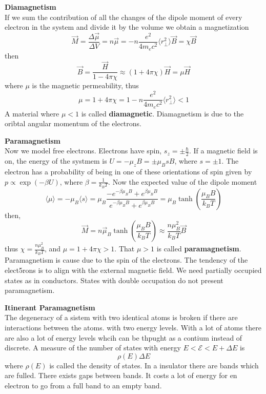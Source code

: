 \documentclass[12pt,a4paper]{article}
\begin{document}
\textbf{Diamagnetism}\\
If we sum the contribution of all the changes of the dipole moment of every electron in the system and divide it by the volume we obtain a magnetization
\begin{equation}
	\vec{M} = \frac{\Delta \vec{\mu}}{\Delta V} = n\vec{\mu} = -n\frac{e^2}{4m_e c^2} \langle r_{\perp}^2 \rangle \vec{B} = \chi \vec{B}
\end{equation}
then
\begin{equation}
	\vec{B} = \frac{\vec{H}}{1-4\pi\chi} \approx (1+4\pi\chi)\vec{H} = \mu \vec{H}
\end{equation}
where $ \mu$ is the magnetic permeability, thus
\begin{equation}
	\mu =1 + 4\pi\chi = 1 -n\frac{e^2}{4m_e c^2} \langle r_{\perp}^2 \rangle < 1
\end{equation}
A material where $\mu < 1$ is called \textbf{diamagnetic}. Diamagnetism is due to the oribtal angular momentum of the electrons.

\textbf{Paramagnetism}\\
Now we model free electrons. Electrons have spin, $s_z = \pm \frac{\hbar}{2}$. If a magnetic field is on, the energy of the systmem is $U = -\mu_z B =\pm\mu_B s B $, where $s = \pm 1$. The electron has a probability of being in one of these orientations of spin given by $p \propto \exp (-\beta U)$, where $\beta = \frac{1}{k_B T}$. Now the expected value of the dipole moment
\begin{equation}
	\langle \mu \rangle = -\mu_B \langle s \rangle =\mu_B \frac{-e^{-\beta \mu_B B} + e^{\beta \mu_B B}}{e^{-\beta \mu_B B} + e^{\beta \mu_B B}} = \mu_B\tanh\left( \frac{\mu_B B}{k_B T}\right)
\end{equation}
then,
\begin{equation}
	\vec{M} = n\vec{\mu}_B \tanh \left( \frac{\mu_B B}{k_B T}\right) \approx  \frac{n\mu_B^2}{k_B T} \vec{B}
\end{equation}
thus $\chi = \frac{n \mu_B^2}{k_B T}$, and $\mu = 1 + 4\pi \chi > 1$. That $\mu > 1$ is called \textbf{paramagnetism}. Paramagnetism is cause due to the spin of the electrons. The tendency of the elect5rons is to align with the external magnetic field. We need partially occupied states as in conductors. States with double occupation do not present paramagnetism.

\textbf{Itinerant Paramagnetism}\\
The degeneracy of a sistem with two identical atoms is broken if there are interactions between the atoms. with two energy levels. With a lot of atoms there are also a lot of energy levels whcih can be thpught as  a contium instead of discrete. A measure of the number of states with energy $E < \mathcal{E} <E + \Delta E$ is
	\begin{equation}
		\rho(E) \Delta E
	\end{equation}
where $\rho(E)$ is called the density of states.
In a insulator there are bands which are fulled. There exists gaps between bands. It costs a lot of energy for en electron to go from a full band to an empty band.
\end{document}
